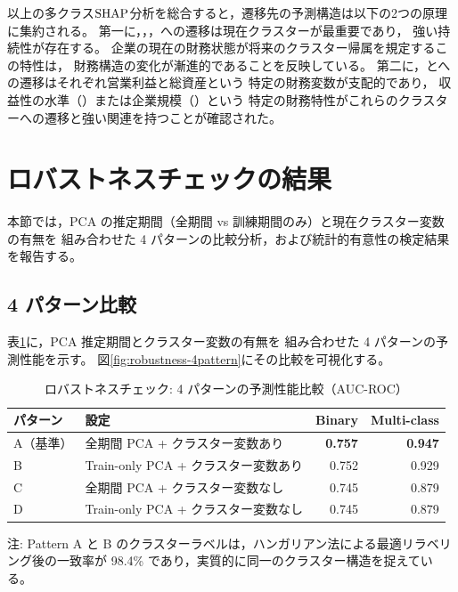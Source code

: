 以上の多クラス$\mathrm{SHAP}$分析を総合すると，遷移先の予測構造は以下の2つの原理に集約される。
第一に，，，への遷移は現在クラスターが最重要であり，
強い持続性が存在する。
企業の現在の財務状態が将来のクラスター帰属を規定するこの特性は，
財務構造の変化が漸進的であることを反映している。
第二に，とへの遷移はそれぞれ営業利益と総資産という
特定の財務変数が支配的であり，
収益性の水準（）または企業規模（）という
特定の財務特性がこれらのクラスターへの遷移と強い関連を持つことが確認された。

\section{ロバストネスチェックの結果}
\label{sec:results-robustness}

本節では，PCA の推定期間（全期間 vs 訓練期間のみ）と現在クラスター変数の有無を
組み合わせた 4 パターンの比較分析，および統計的有意性の検定結果を報告する。

\subsection{4 パターン比較}

表\ref{tab:robustness-4pattern}に，PCA 推定期間とクラスター変数の有無を
組み合わせた 4 パターンの予測性能を示す。
図\ref{fig:robustness-4pattern}にその比較を可視化する。

\begin{table}[htbp]
  \centering
  \caption{ロバストネスチェック: 4 パターンの予測性能比較（AUC-ROC）}
  \label{tab:robustness-4pattern}
  \begin{tabular}{llrr}
    \toprule
    パターン & 設定 & Binary & Multi-class \\
    \midrule
    A（基準）& 全期間 PCA + クラスター変数あり & \textbf{0.757} & \textbf{0.947} \\
    B        & Train-only PCA + クラスター変数あり & 0.752 & 0.929 \\
    C        & 全期間 PCA + クラスター変数なし & 0.745 & 0.879 \\
    D        & Train-only PCA + クラスター変数なし & 0.745 & 0.879 \\
    \bottomrule
  \end{tabular}
  \begin{tablenotes}
    \small
    \item 注: Pattern A と B のクラスターラベルは，ハンガリアン法による最適リラベリング後の一致率が 98.4\% であり，実質的に同一のクラスター構造を捉えている。
  \end{tablenotes}
\end{table}


